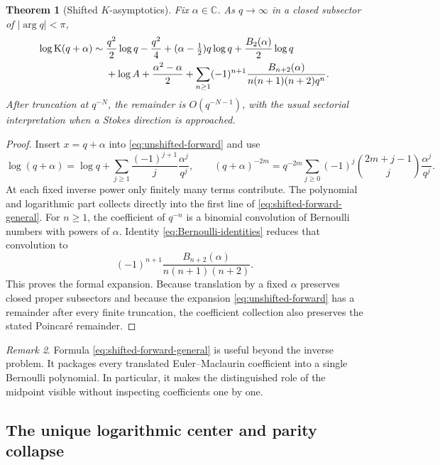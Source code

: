 \documentclass[11pt,oneside]{article}
\theoremstyle{plain}
\newtheorem{theorem}{Theorem}[section]
\theoremstyle{definition}
\theoremstyle{remark}
\newtheorem{remark}[theorem]{Remark}
\newcommand{\Kfun}{\operatorname{K}}
\newcommand{\C}{\mathbb{C}}
\begin{document}
\begin{theorem}[Shifted \(K\)-asymptotics]
\label{thm:shifted-forward}
Fix \(\alpha\in\C\).  As \(q\to\infty\) in a closed subsector of
\(|\arg q|<\pi\),
\begin{align}
 \log\Kfun(q+\alpha)
 \sim{}&\frac{q^2}{2}\log q-\frac{q^2}{4}
 +(\alpha-\tfrac12)q\log q
 +\frac{B_2(\alpha)}{2}\log q
 \notag\\
 &+\log A+\frac{\alpha^2-\alpha}{2}
 +\sum_{n\ge1}(-1)^{n+1}
   \frac{B_{n+2}(\alpha)}{n(n+1)(n+2)q^n}.
 \label{eq:shifted-forward-general}
\end{align}
After truncation at \(q^{-N}\), the remainder is \(O(q^{-N-1})\), with the
usual sectorial interpretation when a Stokes direction is approached.
\end{theorem}

\begin{proof}
Insert \(x=q+\alpha\) into \eqref{eq:unshifted-forward} and use
\[
 \log(q+\alpha)=\log q+
 \sum_{j\ge1}\frac{(-1)^{j+1}}{j}\frac{\alpha^j}{q^j},
 \qquad
 (q+\alpha)^{-2m}=q^{-2m}
 \sum_{j\ge0}(-1)^j\binom{2m+j-1}{j}\frac{\alpha^j}{q^j}.
\]
At each fixed inverse power only finitely many terms contribute.  The
polynomial and logarithmic part collects directly into the first line of
\eqref{eq:shifted-forward-general}.  For \(n\ge1\), the coefficient of
\(q^{-n}\) is a binomial convolution of Bernoulli numbers with powers of
\(\alpha\).  Identity \eqref{eq:Bernoulli-identities} reduces that convolution
to
\[
 (-1)^{n+1}\frac{B_{n+2}(\alpha)}{n(n+1)(n+2)}.
\]
This proves the formal expansion.  Because translation by a fixed \(\alpha\)
preserves closed proper subsectors and because the expansion
\eqref{eq:unshifted-forward} has a remainder after every finite truncation, the
coefficient collection also preserves the stated Poincar\'e remainder.
\end{proof}

\begin{remark}
Formula \eqref{eq:shifted-forward-general} is useful beyond the inverse
problem.  It packages every translated Euler--Maclaurin coefficient into a
single Bernoulli polynomial.  In particular, it makes the distinguished role
of the midpoint visible without inspecting coefficients one by one.
\end{remark}

\subsection{The unique logarithmic center and parity collapse}
\end{document}
